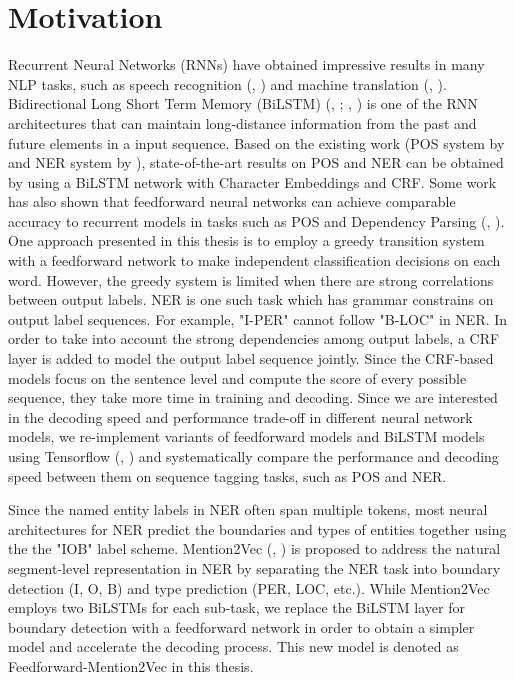 \section{Motivation}
Recurrent Neural Networks (RNNs) have obtained impressive results in many NLP tasks, such as speech recognition (\citeauthor{graves2013speech}, \citeyear{graves2013speech}) and machine translation (\citeauthor{cho2014properties}, \citeyear{cho2014properties}).
Bidirectional Long Short Term Memory (BiLSTM) (\citeauthor{Hochreiter97longshort-term}, \citeyear{Hochreiter97longshort-term}; \citeauthor{graves2005framewise}, \citeyear{graves2005framewise}) is one of the RNN architectures that can maintain long-distance information from the past and future elements in a input sequence. Based on the existing work (POS system by \cite{ling2015finding} and NER system by \cite{lample2016neural}), state-of-the-art results on POS and NER can be obtained by using a BiLSTM network with Character Embeddings and CRF. Some work has also shown that feedforward neural networks can achieve comparable accuracy to recurrent models in tasks such as POS and Dependency Parsing (\citeauthor{andor2016globally}, \citeyear{andor2016globally}). One approach presented in this thesis is to employ a greedy transition system with a feedforward network to make independent classification decisions on each word. However, the greedy system is limited when there are strong correlations between output labels. NER is one such task which has grammar constrains on output label sequences. For example, "I-PER" cannot follow "B-LOC" in NER. In order to take into account the strong dependencies among output labels, a CRF layer is added to model the output label sequence jointly. Since the CRF-based models focus on the sentence level and compute the score of every possible sequence, they take more time in training and decoding. Since we are interested in the decoding speed and performance trade-off in different neural network models, we re-implement variants of feedforward models and BiLSTM models using Tensorflow (\citeauthor{abadi2016tensorflow}, \citeyear{abadi2016tensorflow}) and systematically compare the performance and decoding speed between them on sequence tagging tasks, such as POS and NER.

Since the named entity labels in NER often span multiple tokens, most neural architectures for NER predict the boundaries and types of entities together using the the "IOB" label scheme. Mention2Vec (\citeauthor{stratos2016mention2vec}, \citeyear{stratos2016mention2vec}) is proposed to address the natural segment-level representation in NER by separating the NER task into boundary detection (I, O, B) and type prediction (PER, LOC, etc.). While Mention2Vec employs two BiLSTMs for each sub-task, we replace the BiLSTM layer for boundary detection with a feedforward network in order to obtain a simpler model and accelerate the decoding process. This new model is denoted as Feedforward-Mention2Vec in this thesis.

